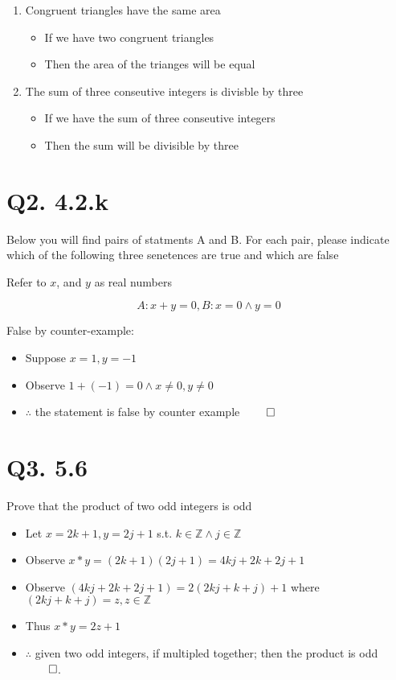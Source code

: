 \documentclass[11pt]{article}
\theoremstyle{plain}
\begin{document}
\begin{enumerate}
    \item Congruent triangles have the same area
        \begin{itemize}
            \item If we have two congruent triangles 
            \item Then the area of the trianges will be equal
        \end{itemize}
    \item The sum of three conseutive integers is divisble by three 
        \begin{itemize}
            \item If we have the sum of three conseutive integers
            \item Then the sum will be divisible by three 
        \end{itemize}
\end{enumerate}

\section{Q2. 4.2.k}

Below you will find pairs of statments A and B. For each pair, please indicate which of the following three senetences are true and which are false

Refer to $x$, and $y$ as real numbers 

$$A: x + y = 0, B: x = 0 \land y = 0$$

False by counter-example: 
\begin{itemize}
    \item Suppose $x=1,y=-1$
    \item Observe $1 + (-1) = 0 \land x \neq 0, y \neq 0$
    \item $\therefore$ the statement is false by counter example $\qed$
\end{itemize}

\section{Q3. 5.6}
Prove that the product of two odd integers is odd

\begin{itemize}
    \item Let $x=2k+1, y=2j+1$ s.t. $k \in \mathbb{Z} \land j \in \mathbb{Z}$
    \item Observe $x*y = (2k+1)(2j+1) = 4kj +2k +2j + 1$
    \item Observe $(4kj +2k +2j + 1) = 2(2kj + k + j) + 1$ where $(2kj+k+j) = z, z \in \mathbb{Z}$
    \item Thus $ x*y = 2z+1$
    \item $\therefore$ given two odd integers, if multipled together; then the product is odd $\qed$.
\end{itemize}
\end{document}
